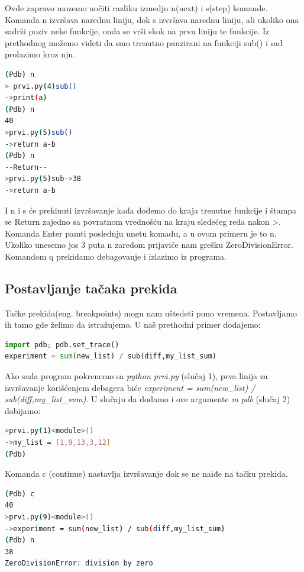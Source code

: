 \documentclass[a4paper]{article}
\begin{document}
Ovde zapravo mozemo uočiti razliku izmedju n(next) i s(step) komande. Komanda n izvršava narednu liniju, dok s izvršava narednu liniju, ali ukoliko ona sadrži poziv neke funkcije, onda se vrši skok na prvu liniju te funkcije. Iz prethodnog možemo videti da smo trenutno pauzirani na funkciji sub() i sad prolazimo kroz nju.
\begin{lstlisting}[language = bash, caption={Izvršavamo prve tri linije u funkciji \emph{sub(40, 2)}}]
(Pdb) n
> prvi.py(4)sub()
->print(a)
(Pdb) n
40
>prvi.py(5)sub()
->return a-b
(Pdb) n
--Return--
>prvi.py(5)sub->38
->return a-b
\end{lstlisting}
I n i s će prekinuti izvršavanje kada dođemo do kraja trenutne funkcije i štampa se \textendash \textendash Return \textendash\textendash zajedno sa povratnom vrednošću na kraju sledećeg reda nakon \textendash>. Komanda Enter pamti poslednju unetu komadu, a u ovom primeru je to n. Ukoliko unesemo jos 3 puta n zaredom prijaviće nam grešku ZeroDivisionError. Komandom q prekidamo debagovanje i izlazimo iz programa.
\subsection{Postavljanje tačaka prekida}
Tačke prekida(eng. breakpoints) mogu nam uštedeti puno vremena. Postavljamo ih tamo gde želimo da istražujemo. U naš prethodni primer dodajemo:
\begin{lstlisting}[language = python, caption = {U primer prvi.py na ovom mestu dodata prva linija}]
import pdb; pdb.set_trace()
experiment = sum(new_list) / sub(diff,my_list_sum)
\end{lstlisting}

Ako sada program pokrenemo sa \emph{python prvi.py} (slučaj 1), prva linija za izvršavanje korišćenjem debagera biće \emph{experiment = sum(new\_list) / sub(diff,my\_list\_sum)}. U slučaju da dodamo i ove argumente \emph{\textendash m  pdb} (slučaj 2) dobijamo:
\begin{lstlisting}[language = bash, caption={U slučaju 2 izvršavanje kreće od prve linije}]
>prvi.py(1)<module>()
->my_list = [1,9,13,3,12]
(Pdb)
\end{lstlisting}
Komanda c (continue) nastavlja izvršavanje dok se ne naiđe na tačku prekida.
\begin{lstlisting}[language = bash, caption={Nastavlja se izvršavanje do tačke prekida i izvršava sledeću liniju}]
(Pdb) c
40
>prvi.py(9)<module>()
->experiment = sum(new_list) / sub(diff,my_list_sum)
(Pdb) n
38
ZeroDivisionError: division by zero
\end{lstlisting}
\end{document}
